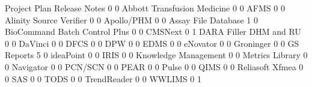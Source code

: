 \documentclass{article}
\begin{document}
\begin{Schunk}
\begin{Soutput}
                                Project Plan Release Notes
                                           0             0
  Abbott Transfusion Medicine              0             0
  AFMS                                     0             0
  Alinity Source Verifier                  0             0
  Apollo/PHM                               0             0
  Assay File Database                      1             0
  BioCommand Batch Control Plus            0             0
  CMSNext                                  0             1
  DARA Filler DHM and RU                   0             0
  DaVinci                                  0             0
  DFCS                                     0             0
  DPW                                      0             0
  EDMS                                     0             0
  eNovator                                 0             0
  Groninger                                0             0
  GS Reports                               5             0
  ideaPoint                                0             0
  IRIS                                     0             0
  Knowledge Management                     0             0
  Metrics Library                          0             0
  Navigator                                0             0
  PCN/SCN                                  0             0
  PEAR                                     0             0
  Pulse                                    0             0
  QIMS                                     0             0
  Reliasoft Xfmea                          0             0
  SAS                                      0             0
  TODS                                     0             0
  TrendReader                              0             0
  WWLIMS                                   0             1
                               

\end{Soutput}
\end{Schunk}
\end{document}
